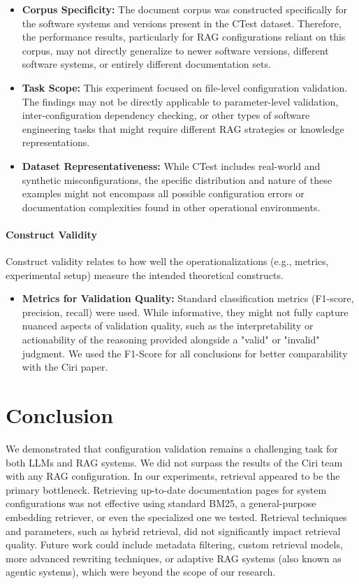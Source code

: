 \begin{itemize}
    \item \textbf{Corpus Specificity:} The document corpus was constructed specifically for the software systems and versions present in the CTest dataset. Therefore, the performance results, particularly for RAG configurations reliant on this corpus, may not directly generalize to newer software versions, different software systems, or entirely different documentation sets.
    \item \textbf{Task Scope:} This experiment focused on file-level configuration validation. The findings may not be directly applicable to parameter-level validation, inter-configuration dependency checking, or other types of software engineering tasks that might require different RAG strategies or knowledge representations.
    \item \textbf{Dataset Representativeness:} While CTest includes real-world and synthetic misconfigurations, the specific distribution and nature of these examples might not encompass all possible configuration errors or documentation complexities found in other operational environments.
\end{itemize}

\paragraph{Construct Validity}
Construct validity relates to how well the operationalizations (e.g., metrics, experimental setup) measure the intended theoretical constructs.
\begin{itemize}
   \item \textbf{Metrics for Validation Quality:} Standard classification metrics (F1-score, precision, recall) were used. While informative, they might not fully capture nuanced aspects of validation quality, such as the interpretability or actionability of the reasoning provided alongside a "valid" or "invalid" judgment. We used the F1-Score for all conclusions for better comparability with the Ciri paper.
\end{itemize}

\section{Conclusion} \label{sec:exp_conclusion}

We demonstrated that configuration validation remains a challenging task for both LLMs and RAG systems. We did not surpass the results of the Ciri team with any RAG configuration. In our experiments, retrieval appeared to be the primary bottleneck. Retrieving up-to-date documentation pages for system configurations was not effective using standard BM25, a general-purpose embedding retriever, or even the specialized one we tested. Retrieval techniques and parameters, such as hybrid retrieval, did not significantly impact retrieval quality. Future work could include metadata filtering, custom retrieval models, more advanced rewriting techniques, or adaptive RAG systems (also known as agentic systems), which were beyond the scope of our research.

